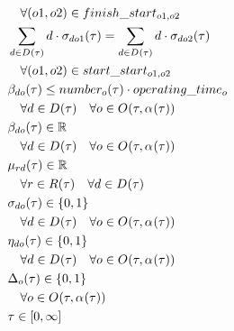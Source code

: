 \begin{alignat}{2}
	& \quad \forall (o1, o2) \in finish\_start_{o1, o2}                                                           \\ 
	& \sum_{d \in D_{}(\tau)} d \cdot \sigma_{do1}(\tau) = \sum_{d \in D_{}(\tau)} d \cdot \sigma_{do2}(\tau)  \notag                               \\ 
	& \quad \forall (o1, o2) \in start\_start_{o1, o2}                                                       \\ 
	& \beta_{do}(\tau) \leq number_{o}(\tau) \cdot operating\_time_{o} \notag                                                     \\ 
	& \quad \forall d \in D_{}(\tau) \quad \forall o \in O_{}(\tau, \alpha_{}(\tau))                                                                  \\
	& \beta_{do}(\tau) \in \mathbb{R} \quad \notag\\
	& \quad \forall d \in D_{}(\tau) \quad \forall o \in O_{}(\tau, \alpha_{}(\tau))                                         \\
	& \mu_{r d}(\tau) \in \mathbb{R} \quad\notag\\
	& \quad \forall r \in R(\tau) \quad \forall d \in D_{}(\tau)                                        \\
	& \sigma_{do}(\tau) \in \{0, 1\}\quad \notag\\
	& \quad \forall d \in D_{}(\tau) \quad \forall o \in O_{}(\tau, \alpha_{}(\tau)) \\
	& \eta_{do}(\tau) \in \{0, 1\}\quad \notag\\
	& \quad \forall d \in D_{}(\tau) \quad \forall o \in O_{}(\tau, \alpha_{}(\tau)) \\
	& \Delta_{o}(\tau) \in \{0, 1\} \\
	& \quad \forall o \in O_{}(\tau, \alpha_{}(\tau))                                      \\
	& \tau \in  [0, \infty] 
\end{alignat}

